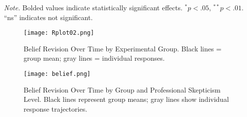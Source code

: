 \documentclass[12pt,english]{article}
\begin{document}
\begin{landscape}
\begin{table}[ht]
\vspace{0.5em}
\raggedright
\footnotesize\textit{Note.} Bolded values indicate statistically significant effects. $^{*}p < .05$, $^{**}p < .01$. “ns” indicates not significant.
\end{table}
\end{landscape}


\begin{figure}[ht]
    \centering
    \texttt{[image: Rplot02.png]}
    \caption{Belief Revision Over Time by Experimental Group. Black lines = group mean; gray lines = individual responses.}
    \label{fig:belief_revision_groups}
\end{figure}


\begin{figure}[ht]
    \centering
    \texttt{[image: belief.png]}
    \caption{Belief Revision Over Time by Group and Professional Skepticism Level. Black lines represent group means; gray lines show individual response trajectories.}
    \label{fig:belief_revision_skepticism}
\end{figure}
\end{document}

